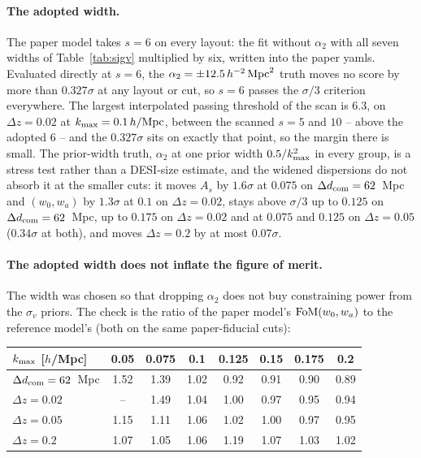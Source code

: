 \documentclass[11pt]{article}
\newcommand{\kmax}{k_{\rm max}}
\newcommand{\hMpc}{\,h/{\rm Mpc}}
\newcommand{\aunit}{\,h^{-2}\,{\rm Mpc}^2}
\newcommand{\sv}{\sigma_v}
\newcommand{\dcom}{$\Delta d_{\rm com} = 62$~Mpc}
\begin{document}
\paragraph{The adopted width.}
The paper model takes $s = 6$ on every layout: the fit without
$\alpha_2$ with all seven widths of Table~\ref{tab:sigv} multiplied by
six, written into the paper yamls.  Evaluated directly at $s = 6$,
the $\alpha_2 = \pm 12.5\aunit$ truth moves no score by more than
$0.327\sigma$ at any layout or cut, so $s = 6$ passes the $\sigma/3$
criterion everywhere.  The largest interpolated passing threshold of
the scan is $6.3$, on $\Delta z = 0.02$ at $\kmax = 0.1\hMpc$, between
the scanned $s = 5$ and $10$ -- above the adopted $6$ -- and the
$0.327\sigma$ sits on exactly that point, so the margin there is
small.  The prior-width truth, $\alpha_2$ at one prior width
$0.5/\kmax^2$ in every group, is a stress test rather than a DESI-size
estimate, and the widened dispersions do not absorb it at the smaller
cuts: it moves $A_s$ by $1.6\sigma$ at $0.075$ on \dcom{} and
$(w_0, w_a)$ by $1.3\sigma$ at $0.1$ on $\Delta z = 0.02$, stays above
$\sigma/3$ up to $0.125$ on \dcom{}, up to $0.175$ on
$\Delta z = 0.02$ and at $0.075$ and $0.125$ on $\Delta z = 0.05$
($0.34\sigma$ at both), and moves $\Delta z = 0.2$ by at most
$0.07\sigma$.

\paragraph{The adopted width does not inflate the figure of merit.}
The width was chosen so that dropping $\alpha_2$ does not buy
constraining power from the $\sv$ priors.  The check is the ratio of
the paper model's ${\rm FoM}(w_0, w_a)$ to the reference model's
(both on the same paper-fiducial cuts):

\begin{center}
  \begin{tabular}{lccccccc}
    \hline
    $\kmax$ [$h$/Mpc] & 0.05 & 0.075 & 0.1 & 0.125 & 0.15 & 0.175 & 0.2 \\
    \hline
    \dcom{} & 1.52 & 1.39 & 1.02 & 0.92 & 0.91 & 0.90 & 0.89 \\
    $\Delta z = 0.02$ & -- & 1.49 & 1.04 & 1.00 & 0.97 & 0.95 & 0.94 \\
    $\Delta z = 0.05$ & 1.15 & 1.11 & 1.06 & 1.02 & 1.00 & 0.97 & 0.95 \\
    $\Delta z = 0.2$ & 1.07 & 1.05 & 1.06 & 1.19 & 1.07 & 1.03 & 1.02 \\
    \hline
  \end{tabular}
\end{center}
\end{document}
